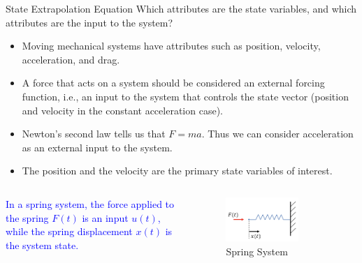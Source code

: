 \begin{frame}{State Extrapolation Equation}
Which attributes are the state variables, and which attributes are the input to the system?
\begin{itemize}
    \item Moving mechanical systems have attributes such as position, velocity, acceleration, and drag.
    \item A force that acts on a system should be considered an external forcing function, i.e., an input to the system that controls the state vector (position and velocity in the constant acceleration case).
    \item Newton’s second law tells us that $F = ma$. Thus we can consider acceleration as an external input to the system.
    \item The position and the velocity are the primary state variables of interest.
\end{itemize}

\begin{columns}
        \textcolor{blue}{In a spring system, the force applied to the spring $F(t)$ is an input $u(t)$, while the spring displacement $x(t)$ is the system state.}
        \begin{figure}
            \centering
            \includegraphics[width=0.7\textwidth]{Figures//Chapter2/SpringSystem.png}
            \caption{Spring System}
            \label{fig:SpringSystem}
        \end{figure}
        

\end{columns}
\end{frame}
